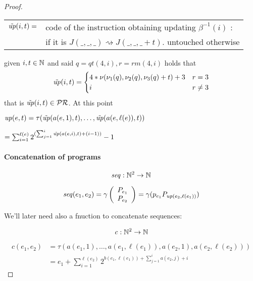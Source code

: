 \begin{theorem}
\begin{proof}
    \begin{center}
      \begin{tabular}{rl}
        $\tilde{\mathit{up}}({i, t})=$ & code of the instruction obtaining updating
                        $\beta^{-1}(i)$ : \\
                      & if it is $J(\_,\_,\_) \rightsquigarrow
                        J(\_,\_,\_ + t)$. untouched otherwise
      \end{tabular}
    \end{center}
    \newcommand{\qt}[1]{\ensuremath{\mathit{qt}({#1})}}
    \newcommand{\rmf}[1]{\ensuremath{\mathit{rm}({#1})}}
    given $i,t \in \mathbb{N}$ and said $q=\qt{4,i}, r=\rmf{4,i}$ holds that
    \[
      \tilde{\mathit{up}}({i,t}) = \begin{cases}
        4 * \nu(\nu_1(q), \nu_2(q), \nu_3(q) + t) + 3 & r=3 \\
        i & r \neq 3
      \end{cases}
    \]
    that is $\tilde{\mathit{up}}({i,t}) \in \mathcal{PR}$. At this point
    \begin{center}
      $\mathit{up}({e,t}) = \tau(\tilde{\mathit{up}}({a(e,1), t}), \dots, \tilde{\mathit{up}}({a(e, \ell(e)), t}))$

      $= \sum^{\ell(e)}_{i=1}2^{(\sum^i_{j=1}\tilde{\mathit{up}}({a(e,i), t}) + (i-1))}-1$
    \end{center}

    \newcommand{\seq}[1]{\ensuremath{\mathit{seq}({#1})}}
    \paragraph{\textbf{Concatenation of programs}}
    \[
      \mathit{seq} : \mathbb{N}^2 \rightarrow \mathbb{N}
    \]

    \[
      \seq{e_1, e_2} = \gamma \left( \begin{array}{c}
                                P_{e_1} \\
                                P_{e_2}
                              \end{array} \right)
                              = \gamma(p_{e_1} P_{\up{e_2,
                                  \ell(e_1)}})
    \]

    We'll  later need also a fnuction to concatenate sequences:

    \newcommand{\conc}[1]{\ensuremath{\mathit{c}({#1})}}
    \[
      \mathit{c}: \mathbb{N}^2 \rightarrow \mathbb{N}
    \]

    \[
      \begin{aligned}
        \conc{e_1, e_2} &= \tau(a(e_1,1), \dots, a(e_1,\ell(e_1)),
        a(e_2,1), a(e_2, \ell(e_2))) \\
        & = e_1 + \sum\limits^{\ell(e_2)}_{i=1} 2^{b(e_1, \ell(e_1))
          +\sum\limits^i_{j=1}a(e_2,j) + i}
      \end{aligned}
    \]


\end{proof}
\end{theorem}
